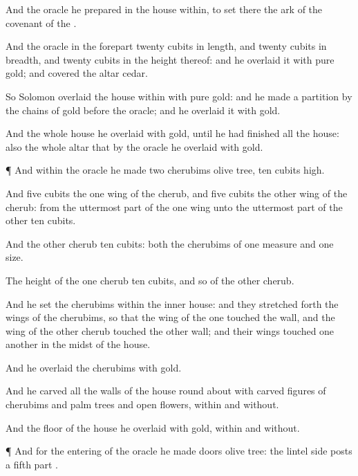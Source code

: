 {And the
oracle he
prepared
in the
house
within, to
set there the
ark of the
covenant of the
{}.

And the
oracle in the
forepart
{}
twenty
cubits in
length, and
twenty
cubits in
breadth, and
twenty
cubits in the
height thereof: and he
overlaid it with
pure
gold; and
{}
covered the
altar
{}
cedar.

So
Solomon
overlaid the
house
within with
pure
gold: and he made a
partition by the
chains of
gold
before the
oracle; and he
overlaid it with
gold.

And the whole
house he
overlaid with
gold, until he had
finished all the
house: also the whole
altar that
{} by the
oracle he
overlaid with
gold.


\par }{\PP {}¶ And within the
oracle he
made
two
cherubims
{}
olive
tree,
{}
ten
cubits
high.

And
five
cubits
{} the
one
wing of the
cherub, and
five
cubits the
other
wing of the
cherub: from the uttermost
part of the one
wing unto the uttermost
part of the
other
{}
ten
cubits.

And the
other
cherub
{}
ten
cubits:
both the
cherubims
{} of
one
measure and
one
size.

The
height of the
one
cherub
{}
ten
cubits, and so
{} of the
other
cherub.

And he
set the
cherubims
within the
inner
house: and they stretched
forth the
wings of the
cherubims, so that the
wing of the
one
touched the
{}
wall, and the
wing of the
other
cherub
touched the
other
wall; and their
wings
touched
one
another in the
midst of the
house.

And he
overlaid the
cherubims with
gold.

And he
carved all the
walls of the
house round
about with
carved
figures of
cherubims and palm
trees and
open
flowers,
within and
without.

And the
floor of the
house he
overlaid with
gold,
within and
without.


\par }{\PP {}¶ And for the
entering of the
oracle he
made
doors
{}
olive
tree: the
lintel
{} side
posts
{} a fifth
part
{}.

}
